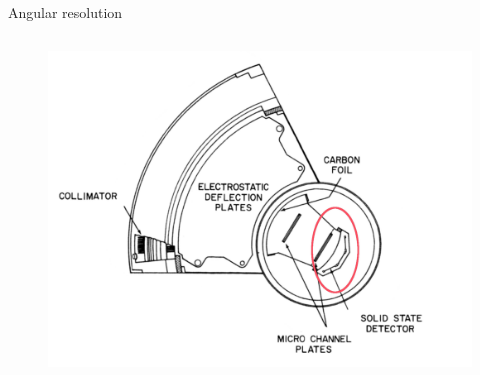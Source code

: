 \documentclass{beamer}
\begin{document}
\begin{frame}{Angular resolution}
	\vspace{-1cm}
	\begin{columns}
		\column{4cm}
		\begin{figure}									
			\includegraphics[scale=0.14]{Pics/swics_sensor_flipped_rotated_ellipse.pdf}
			

\end{figure}
\end{columns}
\end{frame}
\end{document}
